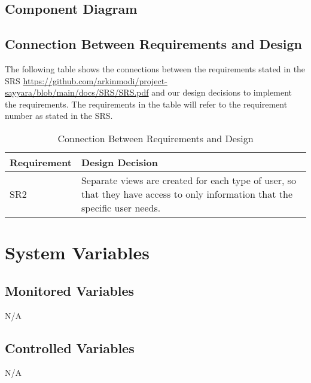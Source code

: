 \documentclass[12pt, titlepage]{article}
\begin{document}
\subsection{Component Diagram}

\subsection{Connection Between Requirements and Design} \label{SecConnection}


The following table shows the connections between the requirements stated in the SRS
\url{https://github.com/arkinmodi/project-sayyara/blob/main/docs/SRS/SRS.pdf} and our design
decisions to implement the requirements. The requirements in the table will refer to the
requirement number as stated in the SRS.

\begin{table}[H]
	\centering
	\caption{Connection Between Requirements and Design}
	\vspace{5pt}
	\begin{tabular}{|p{}|p{}|}
		\hline
		\textbf{Requirement} & \textbf{Design Decision}                                                                                                     \\
		\hline
		SR2                  & Separate views are created for each type of user, so that they have access to only information that the specific user needs. \\
	\end{tabular}
\end{table}

\section{System Variables}
\subsection{Monitored Variables}
N/A

\subsection{Controlled Variables}
N/A
\end{document}

